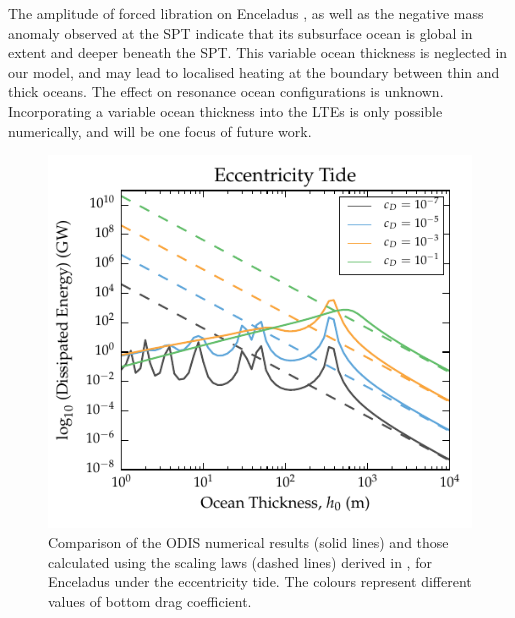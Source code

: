 The amplitude of forced libration on Enceladus \citep{thomas2015enceladus}, as well as the negative mass anomaly observed at the SPT \citep{iess2014gravity, mckinnon2015effect} indicate that its subsurface ocean is global in extent and deeper beneath the SPT. This variable ocean thickness is neglected in our model, and may lead to localised heating at the boundary between thin and thick oceans. The effect on resonance ocean configurations is unknown. Incorporating a variable ocean thickness into the LTEs is only possible numerically, and will be one focus of future work.

\begin{figure}[!t]
\centering
\includegraphics[width=0.85\linewidth]{Figures/enceladus_scaling}
\caption{Comparison of the ODIS numerical results (solid lines) and those calculated using the scaling laws (dashed lines) derived in \citet{chen2013tidal}, for Enceladus under the eccentricity tide. The colours represent different values of bottom drag coefficient. \label{fig:scalEncel}}
\end{figure}

